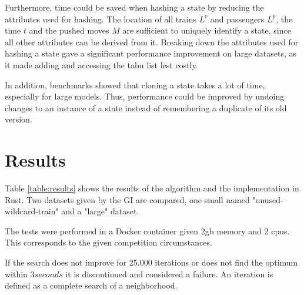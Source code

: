 \documentclass[a4paper,10pt,parskip]{article}
\begin{document}
Furthermore, time could be saved when hashing a state by reducing the attributes 
used for hashing. The location of all trains $L^r$ and passengers $L^p$, the time 
$t$ and the pushed moves $M$ are sufficient to uniquely identify a state, since 
all other attributes can be derived from it. Breaking down the attributes used 
for hashing a state gave a significant performance improvement on large datasets, 
as it made adding and accessing the tabu list lest costly.

In addition, benchmarks showed that cloning a state takes a lot of time, especially 
for large models. Thus, performance could be improved by undoing changes to an 
instance of a state instead of remembering a duplicate of its old version.

\section{Results}

Table \ref{table:results} shows the results of the algorithm and the 
implementation in Rust. Two datasets given by the GI are compared, one small 
named "unused-wildcard-train" and a "large" dataset. 

The tests were performed in a Docker container given 2gb memory and 2 cpus. This 
corresponds to the given competition circumstances.

If the search does not improve for 25.000 iterations or does not find the optimum 
within $3 seconds$ it is discontinued and considered a failure. An iteration 
is defined as a complete search of a neighborhood.
\end{document}
